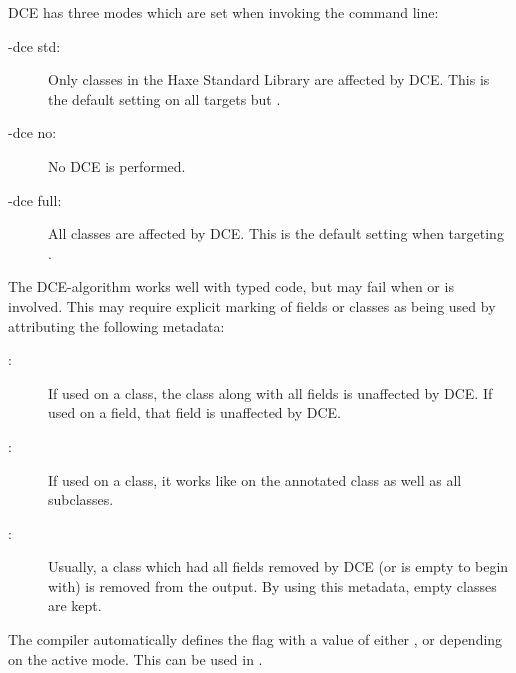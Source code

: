 \documentclass{haxe}
\begin{document}
DCE has three modes which are set when invoking the command line:

\begin{description}
	\item[-dce std:] Only classes in the Haxe Standard Library are affected by DCE. This is the default setting on all targets but .
	\item[-dce no:] No DCE is performed.
	\item[-dce full:] All classes are affected by DCE. This is the default setting when targeting .
\end{description}
The DCE-algorithm works well with typed code, but may fail when  or  is involved. This may require explicit marking of fields or classes as being used by attributing the following metadata:

\begin{description}
	\item[:] If used on a class, the class along with all fields is unaffected by DCE. If used on a field, that field is unaffected by DCE.
	\item[:] If used on a class, it works like  on the annotated class as well as all subclasses.
	\item[:] Usually, a class which had all fields removed by DCE (or is empty to begin with) is removed from the output. By using this metadata, empty classes are kept.
\end{description}
The compiler automatically defines the flag  with a value of either ,  or  depending on the active mode. This can be used in .


\end{document}
